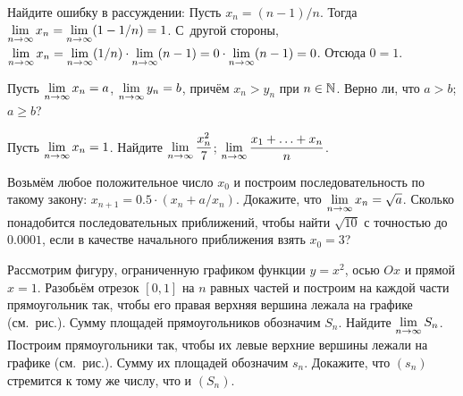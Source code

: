 \documentclass[a4paper,12pt]{article}
\begin{document}
Найдите ошибку в рассуждении:
 Пусть $x_n=(n-1)/n$. Тогда $\lim\limits_{n \rightarrow \infty} x_n = \lim\limits_{n \rightarrow \infty}(1-1/n)=1$. С~другой стороны, $\lim\limits_{n \rightarrow \infty} x_n = \lim\limits_{n \rightarrow \infty}(1/n)\cdot\lim\limits_{n \rightarrow \infty}(n-1) = 0\cdot\lim\limits_{n \rightarrow \infty} (n-1)= 0$. Отсюда $0=1$.

Пусть $\lim\limits_{n \rightarrow \infty} x_n =a$, $\lim\limits_{n \rightarrow \infty} y_n = b$, причём $x_n>y_n$ при $n\in\mathbb{N}$. Верно ли, что
 $a>b$;
 $a\geq b$?

\vspace*{-2.1truemm}

Пусть $\lim\limits_{n \rightarrow \infty} x_n = 1$. Найдите
  $\lim\limits_{n \rightarrow \infty}\dfrac{x_n^2}{7}$;
 $\lim\limits_{n \rightarrow \infty}\dfrac{x_1+\ldots+x_n}n$.


Возьмём любое положительное число $x_0$ и построим последовательность по такому закону: $x_{n+1}=0.5\cdot(x_n+a/x_n)$.
Докажите, что $\lim\limits_{n \rightarrow \infty} x_n=\sqrt a$.
Сколько понадобится последовательных приближений, чтобы найти $\sqrt{10}$ с точностью до $0.0001$, если в качестве начального приближения взять $x_0 = 3$?


\vspace*{-2truemm}

Рассмотрим фигуру, ограниченную графиком функции $y=x^2$, осью $Ox$ и прямой $x=1$. Разобьём отрезок $[0,1]$ на $n$ равных частей и построим на каждой части прямоугольник так, чтобы его правая верхняя вершина лежала на графике (см.~рис.). Сумму площадей прямоугольников обозначим $S_n$. Найдите $\lim\limits_{n \rightarrow \infty} S_n$.
\\
Построим прямоугольники так, чтобы их левые верхние вершины лежали на графике (см.~рис.). Сумму их площадей обозначим $s_n$. Докажите, что $(s_n)$ стремится к тому же числу, что и $(S_n)$.


\vfill
{}

\end{document}
